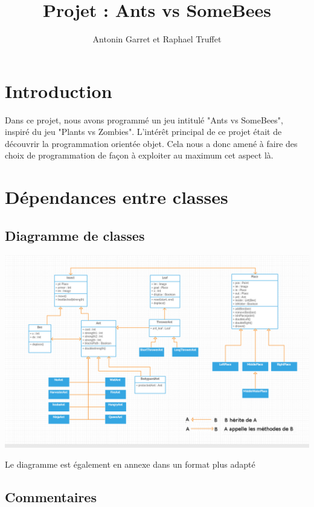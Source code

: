\documentclass[10pt,a4paper]{article}
\author{Antonin Garret et Raphael Truffet}
\title{Projet : Ants vs SomeBees}
\date{}
\begin{document}
\maketitle
\tableofcontents
\newpage

\section*{Introduction}

Dans ce projet, nous avons programmé un jeu intitulé "Ants vs SomeBees", inspiré du jeu "Plants vs Zombies". L'intérêt principal de ce projet était de découvrir la programmation orientée objet. Cela nous a donc amené à faire des choix de programmation de façon à exploiter au maximum cet aspect là.

\section{Dépendances entre classes}
\subsection{Diagramme de classes}

\begin{center}
\includegraphics[scale=0.3]{ClassDiagram}
\label{ClassDiagram}
\end{center}

Le diagramme est également en annexe dans un format plus adapté

\subsection{Commentaires}
\end{document}

